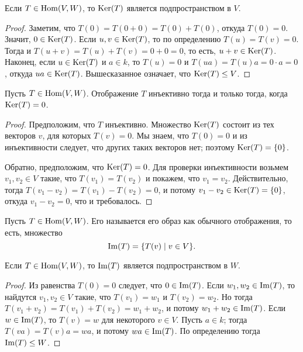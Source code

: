 \begin{proposition}\label{prop:kernel-is-subspace}
Если $T\in\operatorname{Hom}(V,W)$, то $\operatorname{Ker}(T)$ является подпространством
в $V$.
\end{proposition}
\begin{proof}
Заметим, что $T(0) = T(0+0) = T(0)+T(0)$, откуда
$T(0)=0$. Значит, $0\in\operatorname{Ker}(T)$.
Если $u,v\in\operatorname{Ker}(T)$, то по определению $T(u)=T(v)=0$.
Тогда и $T(u+v) = T(u)+T(v) = 0+0=0$, то есть, $u+v\in\operatorname{Ker}(T)$.
Наконец, если $u\in\operatorname{Ker}(T)$ и $a\in k$, то
$T(u)=0$ и $T(ua)=T(u)a=0\cdot a = 0$, откуда $ua\in\operatorname{Ker}(T)$.
Вышесказанное означает, что $\operatorname{Ker}(T)\leq V$.
\end{proof}
\begin{proposition}\label{prop:injective-iff-kernel-trivial}
Пусть $T\in\operatorname{Hom}(V,W)$. Отображение $T$ инъективно тогда и только
тогда, когда $\operatorname{Ker}(T) = 0$.
\end{proposition}
\begin{proof}
Предположим, что $T$ инъективно. Множество $\operatorname{Ker}(T)$ состоит из
тех векторов $v$, для которых $T(v) = 0$. Мы знаем, что
$T(0)=0$ и из инъективности следует, что других таких векторов
нет; поэтому $\operatorname{Ker}(T) = \{0\}$.

Обратно, предположим, что $\operatorname{Ker}(T)=0$. Для проверки инъективности
возьмем $v_1,v_2\in V$ такие, что $T(v_1)=T(v_2)$ и покажем,
что $v_1=v_2$. Действительно, тогда $T(v_1-v_2) =
T(v_1)-T(v_2) = 0$, и потому $v_1-v_2\in\operatorname{Ker}(T) = \{0\}$,
откуда $v_1-v_2=0$, что и требовалось.
\end{proof}

\begin{definition}
Пусть $T\in\operatorname{Hom}(V,W)$. Его  называется его
образ как обычного отображения, то есть, множество
$$
\operatorname{Im}(T) = \{T(v)\mid v\in V\}.
$$
\end{definition}

\begin{proposition}\label{prop:image-is-subspace}
Если $T\in\operatorname{Hom}(V,W)$, то $\operatorname{Im}(T)$ является подпространством
в $W$.
\end{proposition}
\begin{proof}
Из равенства $T(0)=0$ следует, что $0\in\operatorname{Im}(T)$.
Если $w_1,w_2\in\operatorname{Im}(T)$, то найдутся $v_1,v_2\in V$ такие, что
$T(v_1)=w_1$ и $T(v_2)=w_2$. Но тогда
$T(v_1+v_2) = T(v_1) + T(v_2) = w_1 + w_2$, и потому
$w_1 + w_2 \in \operatorname{Im}(T)$.
Если $w\in\operatorname{Im}(T)$, то $T(v)=w$ для некоторого $v\in V$.
Пусть $a\in k$; тогда $T(va) = T(v)a = wa$, и потому
$wa\in\operatorname{Im}(T)$. По определению тогда $\operatorname{Im}(T)\leq W$.
\end{proof}

